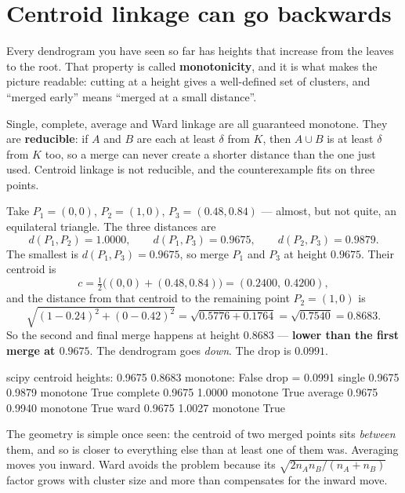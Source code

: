 \documentclass[11pt]{article}
\begin{document}
\section{Centroid linkage can go backwards}
\label{sec:inv}

Every dendrogram you have seen so far has heights that increase from the
leaves to the root. That property is called \textbf{monotonicity}, and it is
what makes the picture readable: cutting at a height gives a well-defined set
of clusters, and ``merged early'' means ``merged at a small distance''.

Single, complete, average and Ward linkage are all guaranteed monotone. They
are \textbf{reducible}: if $A$ and $B$ are each at least $\delta$ from $K$,
then $A \cup B$ is at least $\delta$ from $K$ too, so a merge can never create
a shorter distance than the one just used. Centroid linkage is not reducible,
and the counterexample fits on three points.

\begin{worked}
Take $P_1 = (0,0)$, $P_2 = (1,0)$, $P_3 = (0.48, 0.84)$ --- almost, but not
quite, an equilateral triangle. The three distances are
\[
  d(P_1,P_2) = 1.0000, \qquad d(P_1,P_3) = 0.9675, \qquad d(P_2,P_3) = 0.9879 .
\]
The smallest is $d(P_1,P_3) = 0.9675$, so merge $P_1$ and $P_3$ at height
$0.9675$. Their centroid is
\[
  c = \tfrac12\bigl((0,0) + (0.48, 0.84)\bigr) = (0.2400,\ 0.4200),
\]
and the distance from that centroid to the remaining point $P_2 = (1,0)$ is
\[
  \sqrt{(1 - 0.24)^2 + (0 - 0.42)^2} = \sqrt{0.5776 + 0.1764}
  = \sqrt{0.7540} = 0.8683 .
\]
So the second and final merge happens at height $\mathbf{0.8683}$ ---
\textbf{lower than the first merge at $0.9675$}. The dendrogram goes
\emph{down}. The drop is $0.0991$.
\end{worked}

\begin{codeout}
scipy centroid heights: 0.9675 0.8683
monotone: False   drop = 0.0991
  single    0.9675 0.9879  monotone True
  complete  0.9675 1.0000  monotone True
  average   0.9675 0.9940  monotone True
  ward      0.9675 1.0027  monotone True
\end{codeout}

The geometry is simple once seen: the centroid of two merged points sits
\emph{between} them, and so is closer to everything else than at least one of
them was. Averaging moves you inward. Ward avoids the problem because its
$\sqrt{2 n_A n_B/(n_A+n_B)}$ factor grows with cluster size and more than
compensates for the inward move.
\end{document}
